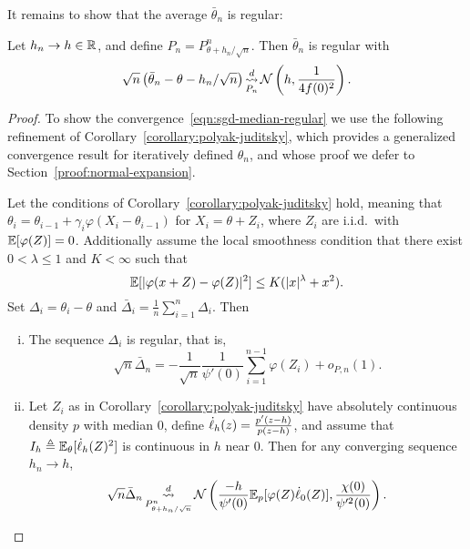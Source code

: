 It remains to show that the average $\bar{\theta}_n$ is regular:
\begin{lemma}
  \label{lemma:sgd-median-regular}
  Let $h_n \to h \in \mathbb{R}$, and define $P_n = P_{\theta + h_n / \sqrt{n}}^n$.
  Then $\bar{\theta}_n$ is regular with
  \begin{align}
    \label{eqn:sgd-median-regular}
    \sqrt{n}\left( \bar{\theta}_n - \theta - h_n / \sqrt{n}\right)
    \mathop{\stackrel{d}{\rightsquigarrow}}_{P_n}
    \mathcal{N}\left( h,\frac{1}{4 f(0)^2}\right).
  \end{align}
\end{lemma}
\begin{proof}
  To show the convergence~\eqref{eqn:sgd-median-regular} we use the
  following refinement of Corollary~\ref{corollary:polyak-juditsky}, which
  provides a generalized convergence result for iteratively defined
  $\theta_n$, and whose
  proof we defer to Section~\ref{proof:normal-expansion}.
  \begin{corollary}
    \label{corollary:normal-expansion}
    Let the conditions of Corollary~\ref{corollary:polyak-juditsky} hold,
    meaning that $\theta_i = \theta_{i-1} + \gamma_i \varphi(X_i -
    \theta_{i-1})$ for $X_i = \theta + Z_i$, where $Z_i$ are i.i.d.\ with
    $\mathbb{E}[\varphi(Z)] = 0$. Additionally assume the local smoothness
    condition that there exist $0 < \lambda \le 1$ and $K < \infty$ such
    that
    \begin{equation}
      \label{eqn:additional-local-smooth}
      \mathbb{E}[|\varphi(x + Z) - \varphi(Z)|^2]
      \le K (|x|^\lambda + x^2).
    \end{equation}
    Set $\Delta_i = \theta_i - \theta$ and $\bar{\Delta}_i = \frac{1}{n}
    \sum_{i=1}^n \Delta_i$. Then
    \begin{enumerate}[(i)]
    \item \label{item:regularity}
      The sequence $\Delta_i$ is regular, that is,
      \begin{equation}
        \sqrt{n} \bar{\Delta}_n
        = -\frac{1}{\sqrt{n}} \frac{1}{\psi'(0)} \sum_{i=1}^{n-1} \varphi(Z_i)
        + o_{P,n}(1).
        \label{eq:normal_expansion_lem}
      \end{equation}
    \item \label{item:apply-le-cam} Let $Z_i$ as in
      Corollary~\ref{corollary:polyak-juditsky} have absolutely continuous
      density $p$ with median $0$, define $\dot{\ell}_h(z) = \frac{p'(z - h)}{p(z
        - h)}$, and assume that $I_h \triangleq \mathbb{E}_\theta[\dot{\ell}_h(Z)^2]$ is
      continuous in $h$ near 0.  Then for any converging sequence $h_n \to h$,
      \begin{equation*}
        \sqrt{n} \bar{\Delta}_n
        \mathop{\stackrel{d}{\rightsquigarrow}}_{P_{\theta + h_n/\sqrt{n}}^n}
        \mathcal{N}\left( \frac{-h}{\psi'(0)} \mathbb{E}_p[\varphi(Z) \dot{\ell}_0(Z)],
        \frac{\chi(0)}{\psi'^2(0)} \right).
      \end{equation*}
    \end{enumerate}
  \end{corollary}


\end{proof}
